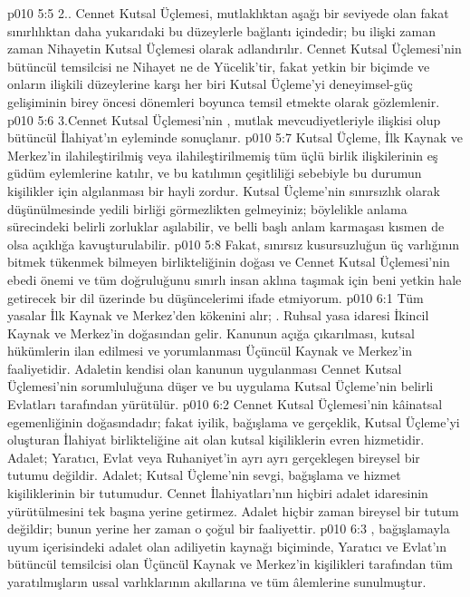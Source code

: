 \vs p010 5:5 2.\bibnobreakspace {}. Cennet Kutsal Üçlemesi, mutlaklıktan aşağı bir seviyede olan fakat sınırlılıktan daha yukarıdaki bu düzeylerle bağlantı içindedir; bu ilişki zaman zaman Nihayetin Kutsal Üçlemesi olarak adlandırılır. Cennet Kutsal Üçlemesi’nin bütüncül temsilcisi ne Nihayet ne de Yücelik’tir, fakat yetkin bir biçimde ve onların ilişkili düzeylerine karşı her biri Kutsal Üçleme’yi deneyimsel\hyp{}güç gelişiminin birey öncesi dönemleri boyunca temsil etmekte olarak gözlemlenir.
\vs p010 5:6 3.\bibnobreakspace Cennet Kutsal Üçlemesi’nin , mutlak mevcudiyetleriyle ilişkisi olup bütüncül İlahiyat’ın eyleminde sonuçlanır.
\vs p010 5:7 Kutsal Üçleme, İlk Kaynak ve Merkez’in ilahileştirilmiş veya ilahileştirilmemiş tüm üçlü birlik ilişkilerinin eş güdüm eylemlerine katılır, ve bu katılımın çeşitliliği sebebiyle bu durumun kişilikler için algılanması bir hayli zordur. Kutsal Üçleme’nin sınırsızlık olarak düşünülmesinde yedili birliği görmezlikten gelmeyiniz; böylelikle anlama sürecindeki belirli zorluklar aşılabilir, ve belli başlı anlam karmaşası kısmen de olsa açıklığa kavuşturulabilir.
\vs p010 5:8 Fakat, sınırsız kusursuzluğun üç varlığının bitmek tükenmek bilmeyen birlikteliğinin doğası ve Cennet Kutsal Üçlemesi’nin ebedi önemi ve tüm doğruluğunu sınırlı insan aklına taşımak için beni yetkin hale getirecek bir dil üzerinde bu düşüncelerimi ifade etmiyorum.
\vs p010 6:1 Tüm yasalar İlk Kaynak ve Merkez’den kökenini alır; . Ruhsal yasa idaresi İkincil Kaynak ve Merkez’in doğasından gelir. Kanunun açığa çıkarılması, kutsal hükümlerin ilan edilmesi ve yorumlanması Üçüncül Kaynak ve Merkez’in faaliyetidir. Adaletin kendisi olan kanunun uygulanması Cennet Kutsal Üçlemesi’nin sorumluluğuna düşer ve bu uygulama Kutsal Üçleme’nin belirli Evlatları tarafından yürütülür.
\vs p010 6:2  Cennet Kutsal Üçlemesi’nin kâinatsal egemenliğinin doğasındadır; fakat iyilik, bağışlama ve gerçeklik, Kutsal Üçleme’yi oluşturan İlahiyat birlikteliğine ait olan kutsal kişiliklerin evren hizmetidir. Adalet; Yaratıcı, Evlat veya Ruhaniyet’in ayrı ayrı gerçekleşen bireysel bir tutumu değildir. Adalet; Kutsal Üçleme’nin sevgi, bağışlama ve hizmet kişiliklerinin bir tutumudur. Cennet İlahiyatları’nın hiçbiri adalet idaresinin yürütülmesini tek başına yerine getirmez. Adalet hiçbir zaman bireysel bir tutum değildir; bunun yerine her zaman o çoğul bir faaliyettir.
\vs p010 6:3 , bağışlamayla uyum içerisindeki adalet olan adiliyetin kaynağı biçiminde, Yaratıcı ve Evlat’ın bütüncül temsilcisi olan Üçüncül Kaynak ve Merkez’in kişilikleri tarafından tüm yaratılmışların ussal varlıklarının akıllarına ve tüm âlemlerine sunulmuştur.
